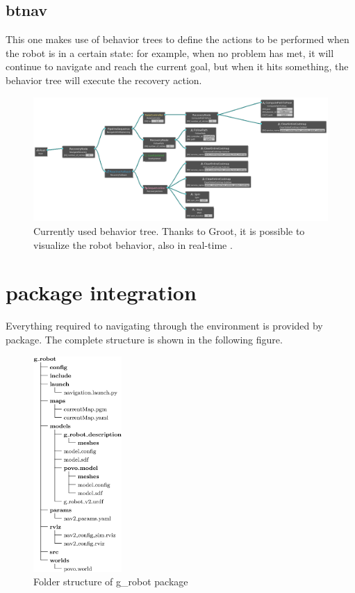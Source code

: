 \subsection*{\Acrfull{btnav}}

This one makes use of behavior trees to define the actions to be performed when the robot is in a certain state: for example, when no problem has met, it will continue to navigate and reach the current goal, but when it hits something, the behavior tree will execute the recovery action.

\begin{figure}[h]
    \centering
    \includegraphics[width=\textwidth]{images/bt-alpha.png}
    \caption{Currently used behavior tree. Thanks to Groot, it is possible to visualize the robot behavior, also in real-time \cite{groot}.}
\end{figure}

\section{ package integration}

Everything required to navigating through the environment is provided by  package. The complete structure is shown in the following figure.

\begin{figure}
  \includegraphics[width=0.3\textwidth]{images/g-robot}
  \caption{Folder structure of g\_robot package}
\end{figure}


